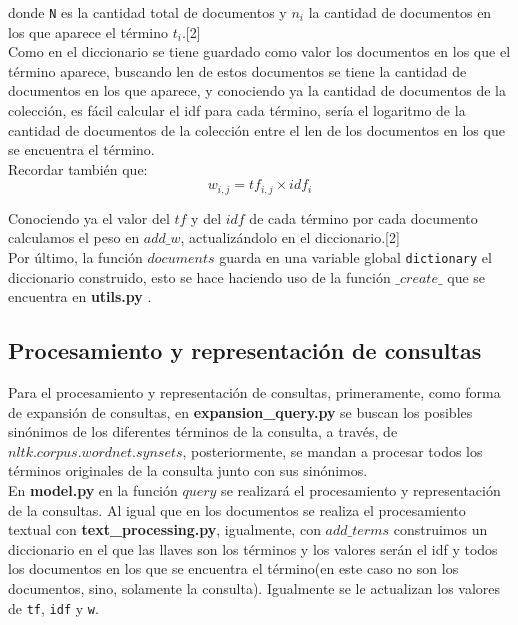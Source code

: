 \documentclass{llncs}
\begin{document}
donde \texttt{N} es la cantidad total de documentos y \texttt{$n_i$} la cantidad de documentos en los que aparece el t\'ermino \texttt{$t_i$}.[2]\\                                                                      

Como en el diccionario se tiene guardado como valor los documentos en los que el t\'ermino aparece, buscando len de estos documentos se tiene la cantidad de documentos en los que aparece, y conociendo ya la cantidad de documentos de la colecci\'on, es f\'acil calcular el idf para cada t\'ermino, ser\'ia el logaritmo de la cantidad de documentos de la colecci\'on entre el len de los documentos en los que se encuentra el t\'ermino.\\

Recordar tambi\'en que:\\

\begin{equation}
	w_{i,j} = tf_{i,j} \times idf_i
\end{equation}


Conociendo ya el valor del $tf$ y del $idf$ de cada t\'ermino por cada documento calculamos el peso en $add\_w$, actualiz\'andolo en el diccionario.[2]\\

Por \'ultimo, la funci\'on $documents$ guarda en una variable global \texttt{dictionary} el diccionario construido, esto se hace haciendo uso de la funci\'on $\_create\_$ que se encuentra en \textbf{utils.py} .\\

\subsection{Procesamiento y representaci\'on de consultas}
Para el procesamiento y representaci\'on de consultas, primeramente, como forma de expansi\'on de consultas, en \textbf{expansion\_query.py} se buscan los posibles sin\'onimos de los diferentes t\'erminos de la consulta, a trav\'es, de $nltk.corpus.wordnet.synsets$, posteriormente, se mandan a procesar todos los t\'erminos originales de la consulta junto con sus sin\'onimos.\\

En \textbf{model.py} en la funci\'on $query$ se realizar\'a el procesamiento y representaci\'on de la consultas. Al igual que en los documentos se realiza el procesamiento textual con \textbf{text\_processing.py}, igualmente, con $add\_terms$ construimos un diccionario en el que las llaves son los t\'erminos y los valores ser\'an el idf y todos los documentos en los que se encuentra el t\'ermino(en este caso no son los documentos, sino, solamente la consulta). Igualmente se le actualizan los valores de \texttt{tf}, \texttt{idf} y \texttt{w}.\\
\end{document}
